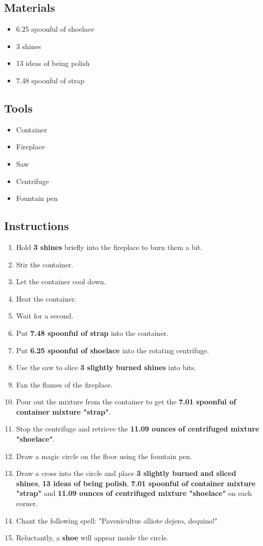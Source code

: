\documentclass{article}
\begin{document}
\subsection{Materials}\begin{itemize}
\item 
6.25 spoonful of shoelace
\item 
3 shines
\item 
13 ideas of being polish
\item 
7.48 spoonful of strap
\end{itemize}
\subsection{Tools}\begin{itemize}
\item 
Container
\item 
Fireplace
\item 
Saw
\item 
Centrifuge
\item 
Fountain pen
\end{itemize}
\subsection{Instructions}\begin{enumerate}
\item 
Hold \textbf{3 shines} briefly into the fireplace to burn them a bit.
\item 
Stir the container.
\item 
Let the container cool down.
\item 
Heat the container.
\item 
Wait for a second.
\item 
Put \textbf{7.48 spoonful of strap} into the container.
\item 
Put \textbf{6.25 spoonful of shoelace} into the rotating centrifuge.
\item 
Use the saw to slice \textbf{3 slightly burned shines} into bits.
\item 
Fan the flames of the fireplace.
\item 
Pour out the mixture from the container to get the \textbf{7.01 spoonful of container mixture "strap"}.
\item 
Stop the centrifuge and retrieve the \textbf{11.09 ounces of centrifuged mixture "shoelace"}.
\item 
Draw a magic circle on the floor using the fountain pen.
\item 
Draw a cross into the circle and place \textbf{3 slightly burned and sliced shines}, \textbf{13 ideas of being polish}, \textbf{7.01 spoonful of container mixture "strap"} and \textbf{11.09 ounces of centrifuged mixture "shoelace"} on each corner.
\item 
Chant the following spell: "Pavenicultus alliote dejero, dequino!"
\item 
Reluctantly, a \textbf{shoe} will appear inside the circle.
\end{enumerate}
\newpage
\end{document}
